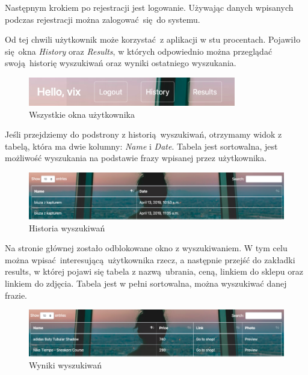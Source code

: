 \newpage
Następnym krokiem po rejestracji jest logowanie. Używając danych wpisanych podczas rejestracji można zalogować się do systemu.

Od tej chwili użytkownik może korzystać z aplikacji w stu procentach.\newline
Pojawiło się okna \emph{History} oraz \emph {Results}, w których odpowiednio można przeglądać swoją historię wyszukiwań oraz wyniki ostatniego wyszukania.
\begin{figure}[h]
    \includegraphics{zdjecia/history_results}
    \caption{Wszystkie okna użytkownika}
\end{figure}

Jeśli przejdziemy do podstrony z historią wyszukiwań, otrzymamy widok z tabelą, która ma dwie kolumny: \emph{Name} i \emph{Date}.\newline
Tabela jest sortowalna, jest możliwość wyszukania na podstawie frazy wpisanej przez użytkownika.
\begin{figure}[h]
    \includegraphics[width=1.10\textwidth]{zdjecia/history}
    \caption{Historia wyszukiwań}
\end{figure}
\newpage
Na stronie głównej zostało odblokowane okno z wyszukiwaniem. W tym celu można wpisać interesującą użytkownika rzecz, a następnie przejść do zakładki results, w której pojawi się tabela z nazwą ubrania, ceną, linkiem do sklepu oraz linkiem do zdjęcia. Tabela jest w pełni sortowalna, można wyszukiwać danej frazie.
\begin{figure}[h]
    \includegraphics[width=1.10\textwidth]{zdjecia/wyniki}
    \caption{Wyniki wyszukiwań}
\end{figure}
